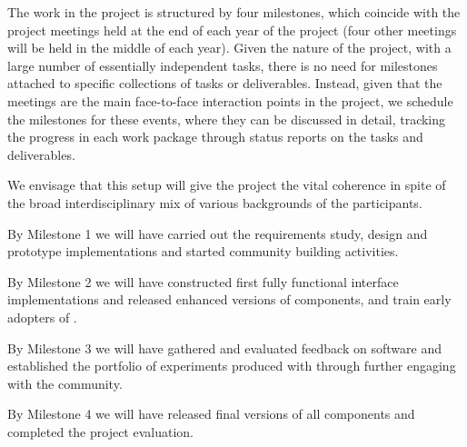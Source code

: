 
The work in the \TheProject project is structured by four milestones, which coincide with
the project meetings held at the end of each year of the project (four other meetings will
be held in the middle of each year). Given the nature of the project, with a large number
of essentially independent tasks, there is no need for milestones attached to specific
collections of tasks or deliverables. Instead, given that the meetings are the main
face-to-face interaction points in the project, we schedule the milestones for these
events, where they can be discussed in detail, tracking the progress in each work package
through status reports on the tasks and deliverables.

We envisage that this setup will give the project the vital coherence
in spite of the broad interdisciplinary mix of various backgrounds of the
participants.

\begin{milestones}
  {By Milestone 1 we will have carried out the requirements study, design and prototype implementations and started community building activities.}

  {By Milestone 2 we will have constructed first fully functional interface implementations and released enhanced versions of \TheProject components, and train early adopters of \TheProject.}

  {By Milestone 3 we will have gathered and evaluated feedback on \TheProject software and established the portfolio of experiments produced with \TheProject through further engaging with the community.}

  {By Milestone 4 we will have released final versions of all \TheProject components and completed the project evaluation.}
\end{milestones}


